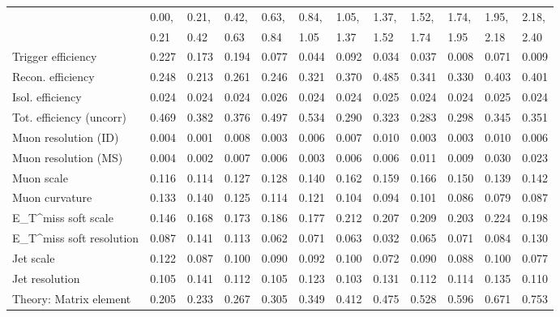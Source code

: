 \begin{tabular}{l|p{0.6cm}p{0.6cm}p{0.6cm}p{0.6cm}p{0.6cm}p{0.6cm}p{0.6cm}p{0.6cm}p{0.6cm}p{0.6cm}p{0.6cm}}
\hline
   & 0.00, & 0.21, & 0.42, & 0.63, & 0.84, & 1.05, & 1.37, & 1.52, & 1.74, & 1.95, & 2.18,  \\ 
   & 0.21 & 0.42 & 0.63 & 0.84 & 1.05 & 1.37 & 1.52 & 1.74 & 1.95 & 2.18 & 2.40  \\ 
\hline
Trigger efficiency                       & 0.227 & 0.173 & 0.194 & 0.077 & 0.044 & 0.092 & 0.034 & 0.037 & 0.008 & 0.071 & 0.009 \\
Recon. efficiency                        & 0.248 & 0.213 & 0.261 & 0.246 & 0.321 & 0.370 & 0.485 & 0.341 & 0.330 & 0.403 & 0.401 \\
Isol. efficiency                         & 0.024 & 0.024 & 0.024 & 0.026 & 0.024 & 0.024 & 0.025 & 0.024 & 0.024 & 0.025 & 0.024 \\
Tot. efficiency (uncorr)                 & 0.469 & 0.382 & 0.376 & 0.497 & 0.534 & 0.290 & 0.323 & 0.283 & 0.298 & 0.345 & 0.351 \\
Muon resolution (ID)                     & 0.004 & 0.001 & 0.008 & 0.003 & 0.006 & 0.007 & 0.010 & 0.003 & 0.003 & 0.010 & 0.006 \\
Muon resolution (MS)                     & 0.004 & 0.002 & 0.007 & 0.006 & 0.003 & 0.006 & 0.006 & 0.011 & 0.009 & 0.030 & 0.023 \\
Muon scale                               & 0.116 & 0.114 & 0.127 & 0.128 & 0.140 & 0.162 & 0.159 & 0.166 & 0.150 & 0.139 & 0.142 \\
Muon curvature                           & 0.133 & 0.140 & 0.125 & 0.114 & 0.121 & 0.104 & 0.094 & 0.101 & 0.086 & 0.079 & 0.087 \\
E_{T}^{miss} soft scale                  & 0.146 & 0.168 & 0.173 & 0.186 & 0.177 & 0.212 & 0.207 & 0.209 & 0.203 & 0.224 & 0.198 \\
E_{T}^{miss} soft resolution             & 0.087 & 0.141 & 0.113 & 0.062 & 0.071 & 0.063 & 0.032 & 0.065 & 0.071 & 0.084 & 0.130 \\
Jet scale                                & 0.122 & 0.087 & 0.100 & 0.090 & 0.092 & 0.100 & 0.072 & 0.090 & 0.088 & 0.100 & 0.077 \\
Jet resolution                           & 0.105 & 0.141 & 0.112 & 0.105 & 0.123 & 0.103 & 0.131 & 0.112 & 0.114 & 0.135 & 0.110 \\
Theory: Matrix element                   & 0.205 & 0.233 & 0.267 & 0.305 & 0.349 & 0.412 & 0.475 & 0.528 & 0.596 & 0.671 & 0.753 \\

\end{tabular}
